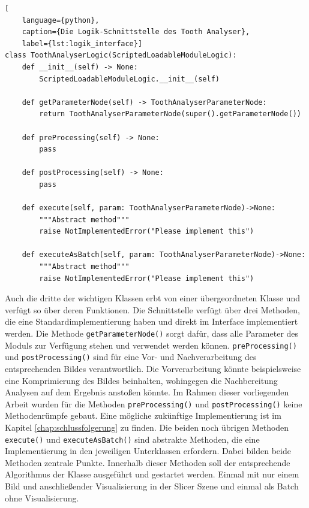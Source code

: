 \pagebreak

\begin{lstlisting}[
    language={python},
    caption={Die Logik-Schnittstelle des Tooth Analyser},
    label={lst:logik_interface}]
class ToothAnalyserLogic(ScriptedLoadableModuleLogic):
    def __init__(self) -> None:
        ScriptedLoadableModuleLogic.__init__(self)

    def getParameterNode(self) -> ToothAnalyserParameterNode:
        return ToothAnalyserParameterNode(super().getParameterNode())

    def preProcessing(self) -> None:
        pass

    def postProcessing(self) -> None:
        pass

    def execute(self, param: ToothAnalyserParameterNode)->None:
        """Abstract method"""
        raise NotImplementedError("Please implement this")

    def executeAsBatch(self, param: ToothAnalyserParameterNode)->None:
        """Abstract method"""
        raise NotImplementedError("Please implement this")
\end{lstlisting}

Auch die dritte der wichtigen Klassen erbt von einer übergeordneten Klasse und
verfügt so über deren Funktionen. Die Schnittstelle verfügt über drei Methoden,
die eine Standardimplementierung haben und direkt im Interface implementiert
werden. Die Methode \texttt{getParameterNode()} sorgt dafür, dass alle Parameter
des Moduls zur Verfügung stehen und verwendet werden können. \texttt{preProcessing()}
und \texttt{postProcessing()} sind für eine Vor- und Nachverarbeitung des entsprechenden
Bildes verantwortlich. Die Vorverarbeitung könnte beispielsweise eine
Komprimierung des Bildes beinhalten, wohingegen die Nachbereitung Analysen auf dem
Ergebnis anstoßen könnte. Im Rahmen dieser vorliegenden Arbeit wurden für die
Methoden \texttt{preProcessing()} und \texttt{postProcessing()} keine
Methodenrümpfe gebaut. Eine mögliche zukünftige Implementierung ist im Kapitel \ref{chap:schlussfolgerung}
zu finden. Die beiden noch übrigen Methoden \texttt{execute()} und \texttt{executeAsBatch()}
sind abstrakte Methoden, die eine Implementierung in den jeweiligen Unterklassen
erfordern. Dabei bilden beide Methoden zentrale Punkte. Innerhalb dieser Methoden
soll der entsprechende Algorithmus der Klasse ausgeführt und gestartet werden.
Einmal mit nur einem Bild und anschließender Visualisierung in der Slicer Szene
und einmal als Batch ohne Visualisierung.

